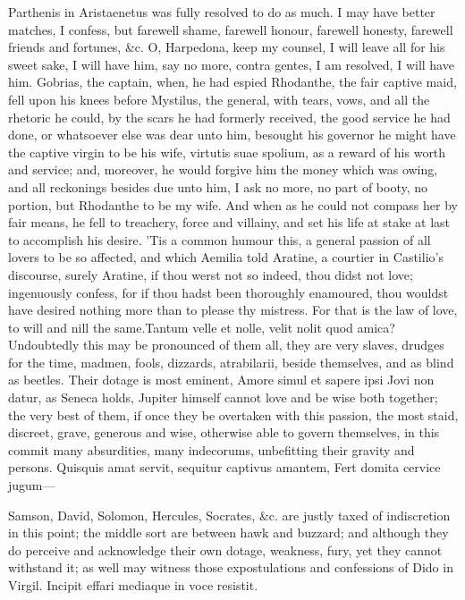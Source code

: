 {Parthenis in Aristaenetus was fully resolved to do as much. I may
have better matches, I confess, but farewell shame, farewell honour,
farewell honesty, farewell friends and fortunes, \&c. O, Harpedona, keep
my counsel, I will leave all for his sweet sake, I will have him, say
no more, contra gentes, I am resolved, I will have him. Gobrias,
the captain, when, he had espied Rhodanthe, the fair captive maid, fell
upon his knees before Mystilus, the general, with tears, vows, and all
the rhetoric he could, by the scars he had formerly received, the good
service he had done, or whatsoever else was dear unto him, besought his
governor he might have the captive virgin to be his wife, virtutis suae
spolium, as a reward of his worth and service; and, moreover, he would
forgive him the money which was owing, and all reckonings besides due
unto him, I ask no more, no part of booty, no portion, but Rhodanthe to
be my wife. And when as he could not compass her by fair means, he fell
to treachery, force and villainy, and set his life at stake at last to
accomplish his desire. 'Tis a common humour this, a general passion of
all lovers to be so affected, and which Aemilia told Aratine, a
courtier in Castilio's discourse, surely Aratine, if thou werst not so
indeed, thou didst not love; ingenuously confess, for if thou hadst
been thoroughly enamoured, thou wouldst have desired nothing more than
to please thy mistress. For that is the law of love, to will and nill
the same.Tantum velle et nolle, velit nolit quod amica?
Undoubtedly this may be pronounced of them all, they are very slaves,
drudges for the time, madmen, fools, dizzards, atrabilarii,
beside themselves, and as blind as beetles. Their dotage is most
eminent, Amore simul et sapere ipsi Jovi non datur, as Seneca holds,
Jupiter himself cannot love and be wise both together; the very best of
them, if once they be overtaken with this passion, the most staid,
discreet, grave, generous and wise, otherwise able to govern
themselves, in this commit many absurdities, many indecorums,
unbefitting their gravity and persons.
Quisquis amat servit, sequitur captivus amantem,
Fert domita cervice jugum---

Samson, David, Solomon, Hercules, Socrates, \&c. are justly taxed of
indiscretion in this point; the middle sort are between hawk and
buzzard; and although they do perceive and acknowledge their own
dotage, weakness, fury, yet they cannot withstand it; as well may
witness those expostulations and confessions of Dido in Virgil.
Incipit effari mediaque in voce resistit.

}

